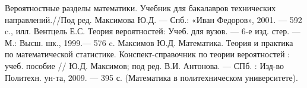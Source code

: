 \documentclass[main.tex]{subfiles}
\begin{document}
	\begin{thebibliography}{99}
		   Вероятностные разделы математики. Учебник для бакалавров технических направлений.//Под ред. Максимова Ю.Д. — Спб.: «Иван Федоров», 2001. — 592 c., илл.
		  Вентцель Е.С. Теория вероятностей: Учеб. для вузов. — 6-е изд. стер. — М.: Высш. шк., 1999.— 576 c.
		 Максимов Ю.Д. Математика. Теория и практика по математической статистике. Конспект-справочник по теории вероятностей : учеб. пособие //
		Ю.Д. Максимов; под ред. В.И. Антонова. — СПб. : Изд-во Политехн.
		ун-та, 2009. — 395 с. (Математика в политехническом университете).
	\end{thebibliography}
\end{document}
